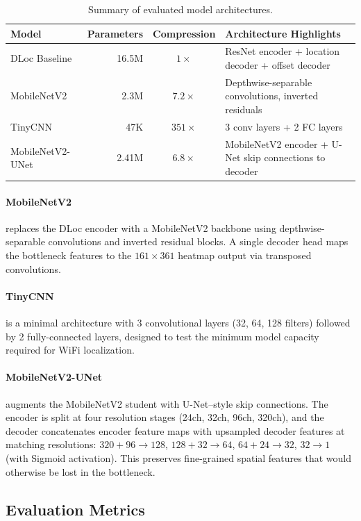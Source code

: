 \documentclass[11pt,a4paper]{article}
\begin{document}
\begin{table}[H]
\centering
\caption{Summary of evaluated model architectures.}
\label{tab:architectures}
\begin{tabular}{@{}lrcl@{}}
\toprule
\textbf{Model} & \textbf{Parameters} & \textbf{Compression} & \textbf{Architecture Highlights} \\
\midrule
DLoc Baseline & 16.5M & $1\times$ & ResNet encoder + location decoder + offset decoder \\
MobileNetV2 & 2.3M & $7.2\times$ & Depthwise-separable convolutions, inverted residuals \\
TinyCNN & 47K & $351\times$ & 3 conv layers + 2 FC layers \\
MobileNetV2-UNet & 2.41M & $6.8\times$ & MobileNetV2 encoder + U-Net skip connections to decoder \\
\bottomrule
\end{tabular}
\end{table}

\paragraph{MobileNetV2} replaces the DLoc encoder with a MobileNetV2 backbone using depthwise-separable convolutions and inverted residual blocks.
A single decoder head maps the bottleneck features to the $161 \times 361$ heatmap output via transposed convolutions.

\paragraph{TinyCNN} is a minimal architecture with 3 convolutional layers (32, 64, 128 filters) followed by 2 fully-connected layers, designed to test the minimum model capacity required for WiFi localization.

\paragraph{MobileNetV2-UNet} augments the MobileNetV2 student with U-Net--style skip connections.
The encoder is split at four resolution stages (24ch, 32ch, 96ch, 320ch), and the decoder concatenates encoder feature maps with upsampled decoder features at matching resolutions:
$320{+}96 \to 128$, $128{+}32 \to 64$, $64{+}24 \to 32$, $32 \to 1$ (with Sigmoid activation).
This preserves fine-grained spatial features that would otherwise be lost in the bottleneck.

\subsection{Evaluation Metrics}
\end{document}
